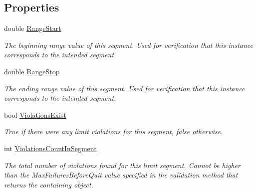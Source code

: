 \subsection*{Properties}
\begin{DoxyCompactItemize}
\item 
double \mbox{\hyperlink{class_c_s_i_1_1_library_1_1_array_utilities_1_1_array_limit_checks_1_1_segment_violations_info_ac531a23e05a88fa0ef19232fd2e1268d}{Range\+Start}}
\begin{DoxyCompactList}\small\item\em The beginning range value of this segment. Used for verification that this instance corresponds to the intended segment. \end{DoxyCompactList}\item 
double \mbox{\hyperlink{class_c_s_i_1_1_library_1_1_array_utilities_1_1_array_limit_checks_1_1_segment_violations_info_a8e1c8dafd75966cd6027d898bb23def4}{Range\+Stop}}
\begin{DoxyCompactList}\small\item\em The ending range value of this segment. Used for verification that this instance corresponds to the intended segment. \end{DoxyCompactList}\item 
bool \mbox{\hyperlink{class_c_s_i_1_1_library_1_1_array_utilities_1_1_array_limit_checks_1_1_segment_violations_info_abe3392755fff9d162f27757e4c3b552c}{Violations\+Exist}}
\begin{DoxyCompactList}\small\item\em True if there were any limit violations for this segment, false otherwise. \end{DoxyCompactList}\item 
int \mbox{\hyperlink{class_c_s_i_1_1_library_1_1_array_utilities_1_1_array_limit_checks_1_1_segment_violations_info_acbdda4b4d875fdf0c50212817022b56b}{Violations\+Count\+In\+Segment}}
\begin{DoxyCompactList}\small\item\em The total number of violations found for this limit segment. Cannot be higher than the Max\+Failures\+Before\+Quit value specified in the validation method that returns the containing object. \end{DoxyCompactList}\end{DoxyCompactItemize}


